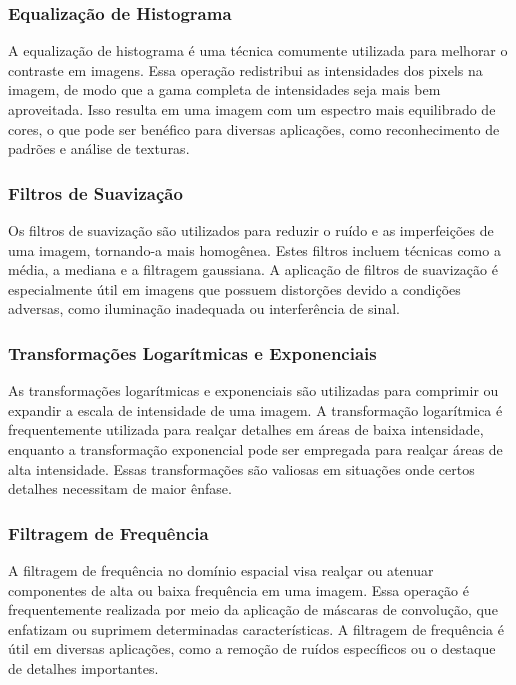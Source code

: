 \documentclass[conference]{IEEEtran}
\begin{document}
\subsubsection{Equalização de Histograma}
A equalização de histograma é uma técnica comumente utilizada para melhorar o contraste em imagens. 
Essa operação redistribui as intensidades dos pixels na imagem, de modo que a gama completa de 
intensidades seja mais bem aproveitada. Isso resulta em uma imagem com um espectro 
mais equilibrado de cores, o que pode ser benéfico para diversas aplicações, como reconhecimento 
de padrões e análise de texturas.

\subsubsection{Filtros de Suavização}
Os filtros de suavização são utilizados para reduzir o ruído e as imperfeições de uma imagem,
tornando-a mais homogênea. Estes filtros incluem técnicas como a média, a mediana e a filtragem 
gaussiana. A aplicação de filtros de suavização é especialmente útil em imagens que possuem 
distorções devido a condições adversas, como iluminação inadequada ou interferência de sinal.

\subsubsection{Transformações Logarítmicas e Exponenciais}
As transformações logarítmicas e exponenciais são utilizadas para comprimir ou expandir a 
escala de intensidade de uma imagem. A transformação logarítmica é frequentemente utilizada 
para realçar detalhes em áreas de baixa intensidade, enquanto a transformação exponencial pode 
ser empregada para realçar áreas de alta intensidade. 
Essas transformações são valiosas em situações onde certos detalhes necessitam de maior ênfase.

\subsubsection{Filtragem de Frequência}
A filtragem de frequência no domínio espacial visa realçar ou atenuar componentes 
de alta ou baixa frequência em uma imagem. Essa operação é frequentemente realizada por meio 
da aplicação de máscaras de convolução, que enfatizam ou suprimem determinadas características. 
A filtragem de frequência é útil em diversas aplicações, como a remoção de ruídos específicos 
ou o destaque de detalhes importantes.
\end{document}
